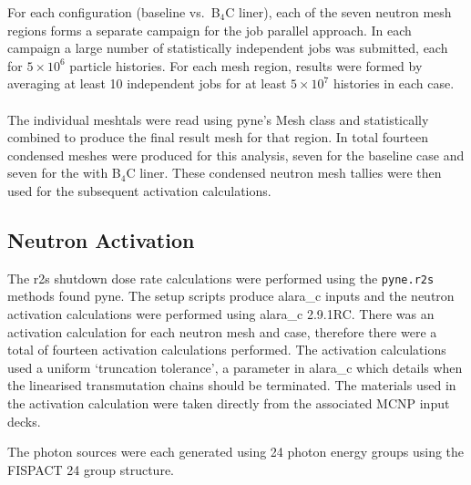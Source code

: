 \documentclass[12pt]{article}
\begin{document}
For each configuration (baseline vs.\ B$_4$C liner), each of the seven neutron
mesh regions forms a separate campaign for the job parallel approach.  In each
campaign a large number of statistically independent jobs was submitted, each
for $5 \times 10^6$ particle histories.  For each mesh region, results were
formed by averaging at least 10 independent jobs for at least $5 \times 10^7$
histories in each case.
\\
\\
The individual meshtals were read using \gls{pyne}'s Mesh class and statistically
combined to produce the final result mesh for that region. In total fourteen 
condensed meshes were produced for this analysis, seven for the baseline case
and seven for the with B$_4$C liner. These condensed neutron mesh tallies were
then used for the subsequent activation calculations.

\subsection{Neutron Activation}
The \gls{r2s} shutdown dose rate calculations were performed using the
\texttt{pyne.r2s} methods found \gls{pyne}. The setup scripts produce
\gls{alara_c} inputs and the neutron activation calculations were performed
using \gls{alara_c} 2.9.1RC. There was an activation calculation for each 
neutron mesh and case, therefore
there were a total of fourteen activation calculations performed. The activation
calculations used a uniform `truncation tolerance', a parameter in \gls{alara_c}
which details when the linearised transmutation chains should be terminated. The
materials used in the activation calculation were taken directly from the 
associated MCNP input decks. 

The photon sources were each generated using 24 photon
energy groups using the FISPACT 24 group structure.
\end{document}

